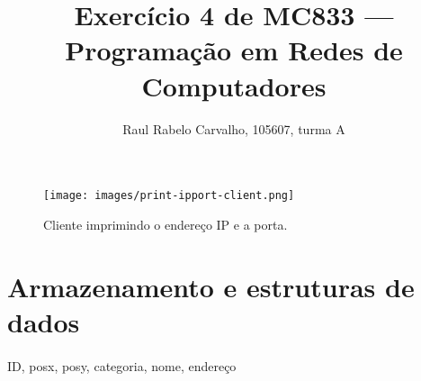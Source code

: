 \documentclass[a4paper,10pt,oneside,final,titlepage,onecolumn]{article}
\title{Exercício 4 de MC833 --- Programação em Redes de Computadores}
\author{Raul Rabelo Carvalho, 105607, turma A}
\begin{document}
\maketitle



\section{}
\begin{figure}[!ht]
  \caption{Cliente imprimindo o endereço IP e a porta.}
  \centering
  \texttt{[image: images/print-ipport-client.png]}
  \label{print-ipport-client}
\end{figure}

\section{Armazenamento e estruturas de dados}
\paragraph{}ID, posx, posy, categoria, nome, endereço
\end{document}
